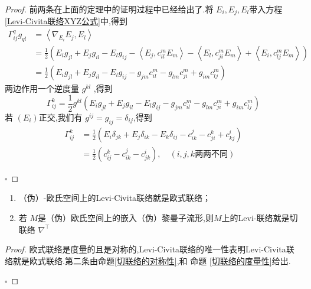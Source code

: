\documentclass[../../几何与拓扑.tex]{subfiles}
\begin{document}
\begin{proof}
    前两条在上面的定理中的证明过程中已经给出了.将 \(  E_{i},E_{j},E_{l}  \)带入方程 \ref{Levi-Civita联络XYZ公式}中,得到 \[
    \begin{aligned}
     \Gamma _{ij}^{q}g_{ql}& = \left< \nabla _{E_{i}}E_{j},E_{l} \right> \\ 
      & =  \frac{1}{2}\left( E_{i}g_{jl}+ E_{j}g_{il}-E_{l}g_{ij}-\left<E_{j},c_{il}^{m}E_{m}\right>  -\left< E_{l},c_{ji}^{m}E_{m}\right>+ \left<E_{i},c_{lj}^{m}E_{m} \right>\right)\\ 
       & =  \frac{1}{2}\left( E_{i}g_{jl}+ E_{j}g_{il}-E_{l}g_{ij} -g_{jm}c_{il}^{m}- g_{lm}c_{ji}^{m}+ g_{im}c_{lj}^{m}\right)  
    \end{aligned}
    \] 两边作用一个逆度量 \(  g^{kl}  \) ,得到 \[
     \Gamma _{ij}^{k}= \frac{1}{2}g^{kl}\left( E_{i}g_{jl}+ E_{j}g_{il}-E_{l}g_{ij}-g_{jm}c_{il}^{m}-g_{lm}c_{ji}^{m}+ g_{im}c_{lj}^{m} \right) 
    \]若 \(  \left( E_{i} \right)   \)正交,我们有 \(  g^{ij}= g_{ij}=  \delta  _{ij}  \),得到 \[
    \begin{aligned}
        \Gamma _{ij}^{k}&= \frac{1}{2}\left( E_{i} \delta  _{jk}+ E_{j} \delta  _{ik}-E_{k} \delta  _{ij}-c_{ik}^{j}-c_{ji}^{k}+ c_{kj}^{i} \right) \\ 
         & =  \frac{1}{2}\left( c_{ij}^{k}-c_{ik}^{j}-c_{jk}^{i} \right),\quad (i,j,k \text{两两不同}) 
    \end{aligned}
    \]  

    \hfill $\square$
\end{proof}

\begin{proposition}
    \begin{enumerate}
        \item （伪）-欧氏空间上的Levi-Civita联络就是欧式联络；
        \item 若 \(  M  \)是（伪）欧氏空间上的嵌入（伪）黎曼子流形,则\(  M  \)上的Levi-联络就是切联络 \(   \nabla ^{\top}  \)   
    \end{enumerate}
    
\end{proposition}
\begin{proof}
    欧式联络是度量的且是对称的,Levi-Civita联络的唯一性表明Levi-Civita联络就是欧式联络.第二条由命题\ref{切联络的对称性},和 命题 \ref{切联络的度量性}给出.

    \hfill $\square$
\end{proof}
\end{document}
